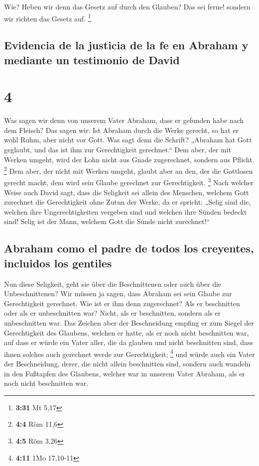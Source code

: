  Wie? Heben wir denn das Gesetz auf durch den Glauben?
Das sei ferne! sondern wir richten das Gesetz auf. \footnote{\textbf{3:31}
  Mt 5,17}

\hypertarget{evidencia-de-la-justicia-de-la-fe-en-abraham-y-mediante-un-testimonio-de-david}{%
\subsection{Evidencia de la justicia de la fe en Abraham y mediante un
testimonio de
David}\label{evidencia-de-la-justicia-de-la-fe-en-abraham-y-mediante-un-testimonio-de-david}}

\hypertarget{section-3}{%
\section{4}\label{section-3}}

 Was sagen wir denn von unserem Vater Abraham, dass er
gefunden habe nach dem Fleisch?  Das sagen wir: Ist
Abraham durch die Werke gerecht, so hat er wohl Ruhm, aber nicht vor
Gott.  Was sagt denn die Schrift? „Abraham hat Gott
geglaubt, und das ist ihm zur Gerechtigkeit gerechnet.`` 
Dem aber, der mit Werken umgeht, wird der Lohn nicht aus Gnade
zugerechnet, sondern aus Pflicht. \footnote{\textbf{4:4} Röm 11,6}
 Dem aber, der nicht mit Werken umgeht, glaubt aber an
den, der die Gottlosen gerecht macht, dem wird sein Glaube gerechnet zur
Gerechtigkeit. \footnote{\textbf{4:5} Röm 3,26}  Nach
welcher Weise auch David sagt, dass die Seligkeit sei allein des
Menschen, welchem Gott zurechnet die Gerechtigkeit ohne Zutun der Werke,
da er spricht:  „Selig sind die, welchen ihre
Ungerechtigkeiten vergeben sind und welchen ihre Sünden bedeckt sind!
 Selig ist der Mann, welchem Gott die Sünde nicht
zurechnet!{}``

\hypertarget{abraham-como-el-padre-de-todos-los-creyentes-incluidos-los-gentiles}{%
\subsection{Abraham como el padre de todos los creyentes, incluidos los
gentiles}\label{abraham-como-el-padre-de-todos-los-creyentes-incluidos-los-gentiles}}

 Nun diese Seligkeit, geht sie über die Beschnittenen oder
auch über die Unbeschnittenen? Wir müssen ja sagen, dass Abraham sei
sein Glaube zur Gerechtigkeit gerechnet.  Wie ist er ihm
denn zugerechnet? Als er beschnitten oder als er unbeschnitten war?
Nicht, als er beschnitten, sondern als er unbeschnitten war.
 Das Zeichen aber der Beschneidung empfing er zum Siegel
der Gerechtigkeit des Glaubens, welchen er hatte, als er noch nicht
beschnitten war, auf dass er würde ein Vater aller, die da glauben und
nicht beschnitten sind, dass ihnen solches auch gerechnet werde zur
Gerechtigkeit; \footnote{\textbf{4:11} 1Mo 17,10-11}  und
würde auch ein Vater der Beschneidung, derer, die nicht allein
beschnitten sind, sondern auch wandeln in den Fußtapfen des Glaubens,
welcher war in unserem Vater Abraham, als er noch nicht beschnitten war.

